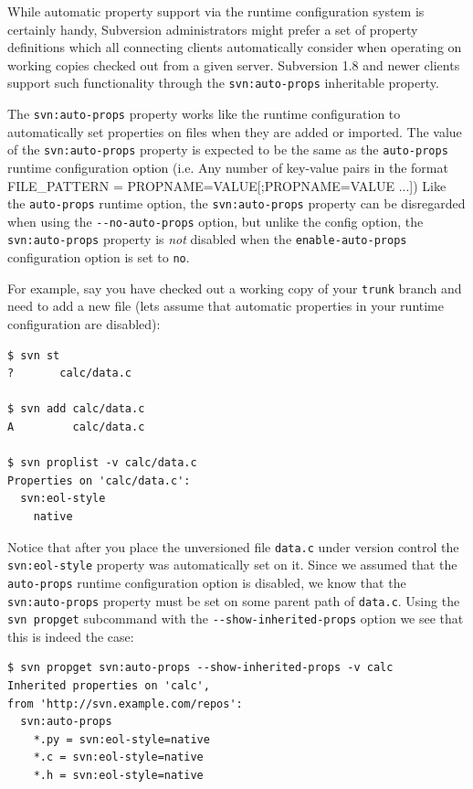 While automatic property support via the runtime configuration system is
certainly handy, Subversion administrators might prefer a set of
property definitions which all connecting clients automatically consider
when operating on working copies checked out from a given server.
Subversion 1.8 and newer clients support such functionality through the
\texttt{svn:auto-props} inheritable property.

The \texttt{svn:auto-props} property works like the runtime
configuration to automatically set properties on files when they are
added or imported. The value of the \texttt{svn:auto-props} property is
expected to be the same as the \texttt{auto-props} runtime configuration
option (i.e. Any number of key-value pairs in the format FILE\_PATTERN =
PROPNAME=VALUE{[};PROPNAME=VALUE ...{]}) Like the \texttt{auto-props}
runtime option, the \texttt{svn:auto-props} property can be disregarded
when using the \texttt{-\/-no-auto-props} option, but unlike the config
option, the \texttt{svn:auto-props} property is \emph{not} disabled when
the \texttt{enable-auto-props} configuration option is set to
\texttt{no}.

For example, say you have checked out a working copy of your
\texttt{trunk} branch and need to add a new file (let\textquotesingle s
assume that automatic properties in your runtime configuration are
disabled):

\begin{verbatim}
$ svn st
?       calc/data.c

$ svn add calc/data.c
A         calc/data.c

$ svn proplist -v calc/data.c
Properties on 'calc/data.c':
  svn:eol-style
    native
\end{verbatim}

Notice that after you place the unversioned file \texttt{data.c} under
version control the \texttt{svn:eol-style} property was automatically
set on it. Since we assumed that the \texttt{auto-props} runtime
configuration option is disabled, we know that the
\texttt{svn:auto-props} property must be set on some parent path of
\texttt{data.c}. Using the \texttt{svn\ propget} subcommand with the
\texttt{-\/-show-inherited-props} option we see that this is indeed the
case:

\begin{verbatim}
$ svn propget svn:auto-props --show-inherited-props -v calc
Inherited properties on 'calc',
from 'http://svn.example.com/repos':
  svn:auto-props
    *.py = svn:eol-style=native
    *.c = svn:eol-style=native
    *.h = svn:eol-style=native
\end{verbatim}

